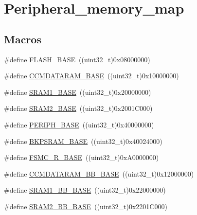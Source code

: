 \hypertarget{group___peripheral__memory__map}{}\section{Peripheral\+\_\+memory\+\_\+map}
\label{group___peripheral__memory__map}
\subsection*{Macros}
\begin{DoxyCompactItemize}
\item 
\#define \hyperlink{group___peripheral__memory__map_ga23a9099a5f8fc9c6e253c0eecb2be8db}{F\+L\+A\+S\+H\+\_\+\+B\+A\+SE}~((uint32\+\_\+t)0x08000000)
\item 
\#define \hyperlink{group___peripheral__memory__map_gabea1f1810ebeac402164b42ab54bcdf9}{C\+C\+M\+D\+A\+T\+A\+R\+A\+M\+\_\+\+B\+A\+SE}~((uint32\+\_\+t)0x10000000)
\item 
\#define \hyperlink{group___peripheral__memory__map_ga7d0fbfb8894012dbbb96754b95e562cd}{S\+R\+A\+M1\+\_\+\+B\+A\+SE}~((uint32\+\_\+t)0x20000000)
\item 
\#define \hyperlink{group___peripheral__memory__map_gadbb42a3d0a8a90a79d2146e4014241b1}{S\+R\+A\+M2\+\_\+\+B\+A\+SE}~((uint32\+\_\+t)0x2001\+C000)
\item 
\#define \hyperlink{group___peripheral__memory__map_ga9171f49478fa86d932f89e78e73b88b0}{P\+E\+R\+I\+P\+H\+\_\+\+B\+A\+SE}~((uint32\+\_\+t)0x40000000)
\item 
\#define \hyperlink{group___peripheral__memory__map_ga52e57051bdf8909222b36e5408a48f32}{B\+K\+P\+S\+R\+A\+M\+\_\+\+B\+A\+SE}~((uint32\+\_\+t)0x40024000)
\item 
\#define \hyperlink{group___peripheral__memory__map_gaddf0e199dccba83272b20c9fb4d3aaed}{F\+S\+M\+C\+\_\+\+R\+\_\+\+B\+A\+SE}~((uint32\+\_\+t)0x\+A0000000)
\item 
\#define \hyperlink{group___peripheral__memory__map_gaf98d1f99ecd952ee59e80b345d835bb0}{C\+C\+M\+D\+A\+T\+A\+R\+A\+M\+\_\+\+B\+B\+\_\+\+B\+A\+SE}~((uint32\+\_\+t)0x12000000)
\item 
\#define \hyperlink{group___peripheral__memory__map_gac4c4f61082e4b168f29d9cf97dc3ca5c}{S\+R\+A\+M1\+\_\+\+B\+B\+\_\+\+B\+A\+SE}~((uint32\+\_\+t)0x22000000)
\item 
\#define \hyperlink{group___peripheral__memory__map_gac33cb6edadf184ab9860d77089503922}{S\+R\+A\+M2\+\_\+\+B\+B\+\_\+\+B\+A\+SE}~((uint32\+\_\+t)0x2201\+C000)

\end{DoxyCompactItemize}
